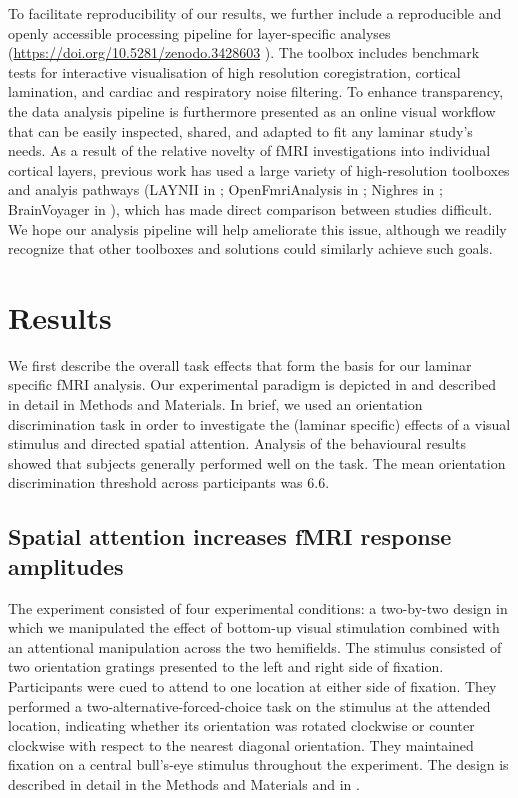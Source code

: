\documentclass[9pt,lineno]{aperture}
\begin{document}
To facilitate reproducibility of our results, we further include a reproducible and openly accessible processing pipeline for layer-specific analyses (\url{https://doi.org/10.5281/zenodo.3428603} \citep{VanMourik2018}). The toolbox includes benchmark tests for interactive visualisation of high resolution coregistration, cortical lamination, and cardiac and respiratory noise filtering. To enhance transparency, the data analysis pipeline is furthermore presented as an online visual workflow that can be easily inspected, shared, and adapted to fit any laminar study’s needs. As a result of the relative novelty of fMRI investigations into individual cortical layers, previous work has used a large variety of high-resolution toolboxes and analyis pathways (LAYNII in \citet{Huber2017,Huber2018}; OpenFmriAnalysis in \citet{Lawrence2018}; Nighres in \citet{Huntenburg2018}; BrainVoyager in \citet{Goebel2012}), which has made direct comparison between studies difficult. We hope our analysis pipeline will help ameliorate this issue, although we readily recognize that other toolboxes and solutions could similarly achieve such goals.

\section{Results}
We first describe the overall task effects that form the basis for our laminar specific fMRI analysis. Our experimental paradigm is depicted in  and described in detail in Methods and Materials. In brief, we used an orientation discrimination task in order to investigate the (laminar specific) effects of a visual stimulus and directed spatial attention. Analysis of the behavioural results showed that subjects generally performed well on the task. The mean orientation discrimination threshold across participants was 6.6\textdegree.

\subsection{Spatial attention increases fMRI response amplitudes}
The experiment consisted of four experimental conditions: a two-by-two design in which we manipulated the effect of bottom-up visual stimulation combined with an attentional manipulation across the two hemifields. The stimulus consisted of two orientation gratings presented to the left and right side of fixation. Participants were cued to attend to one location at either side of fixation. They performed a two-alternative-forced-choice task on the stimulus at the attended location, indicating whether its orientation was rotated clockwise or counter clockwise with respect to the nearest diagonal orientation. They maintained fixation on a central bull's-eye stimulus throughout the experiment. The design is described in detail in the Methods and Materials and in .
\end{document}
